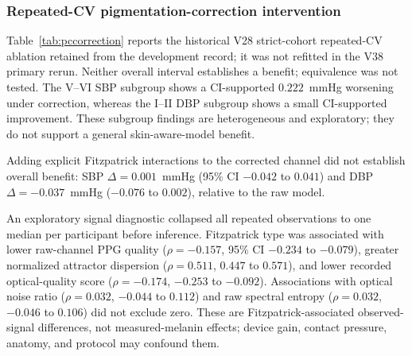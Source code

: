 \documentclass[12pt]{article}
\begin{document}
\subsubsection{Repeated-CV pigmentation-correction intervention}
Table~\ref{tab:pccorrection} reports the historical V28 strict-cohort repeated-CV ablation retained from the development record; it was not refitted in the V38 primary rerun. Neither overall interval establishes a benefit; equivalence was not tested. The V--VI SBP subgroup shows a CI-supported $0.222$~mmHg worsening under correction, whereas the I--II DBP subgroup shows a small CI-supported improvement. These subgroup findings are heterogeneous and exploratory; they do not support a general skin-aware-model benefit.
\begin{table}[t]
\centering
\caption{Pigmentation-Corrected vs.\ Raw Channel in Repeated Participant CV}
\label{tab:pccorrection}
\scriptsize
{}
\end{table}
Adding explicit Fitzpatrick interactions to the corrected channel did not establish overall benefit: SBP $\Delta=0.001$~mmHg (95\% CI $-0.042$ to $0.041$) and DBP $\Delta=-0.037$~mmHg ($-0.076$ to $0.002$), relative to the raw model.

An exploratory signal diagnostic collapsed all repeated observations to one median per participant before inference. Fitzpatrick type was associated with lower raw-channel PPG quality ($\rho=-0.157$, 95\% CI $-0.234$ to $-0.079$), greater normalized attractor dispersion ($\rho=0.511$, $0.447$ to $0.571$), and lower recorded optical-quality score ($\rho=-0.174$, $-0.253$ to $-0.092$). Associations with optical noise ratio ($\rho=0.032$, $-0.044$ to $0.112$) and raw spectral entropy ($\rho=0.032$, $-0.046$ to $0.106$) did not exclude zero. These are Fitzpatrick-associated observed-signal differences, not measured-melanin effects; device gain, contact pressure, anatomy, and protocol may confound them.
\end{document}
